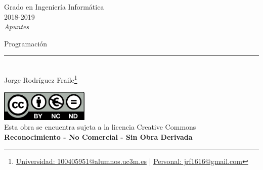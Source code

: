 \documentclass[12pt]{report} %
\begin{document}
	
\begin{titlepage}
	\begin{sffamily}
	\color{azulUC3M}
	\begin{center}
		\begin{figure}[H] %
		\end{figure}
		\vspace{2.5cm}
		\begin{Large}
			Grado en Ingeniería Informática\\			
			2018-2019\\
			\vspace{2cm}		
			\textsl{Apuntes}\\
			\bigskip
		\end{Large}
		 	{\Huge Programación}\\
		 	\vspace*{0.5cm}
	 		\rule{10.5cm}{0.1mm}\\
			\vspace*{0.9cm}
			{\LARGE Jorge Rodríguez Fraile\footnote{\href{mailto:100405951@alumnos.uc3m.es}{Universidad: 100405951@alumnos.uc3m.es}  |  \href{mailto:jrf1616@gmail.com}{Personal: jrf1616@gmail.com}}}\\ 
			\vspace*{1cm}
	\end{center}
	\vfill
	\color{black}
		\includegraphics[width=4.2cm]{img/creativecommons.png}\\
		Esta obra se encuentra sujeta a la licencia Creative Commons\\ \textbf{Reconocimiento - No Comercial - Sin Obra Derivada}
	\end{sffamily}
\end{titlepage}


\tableofcontents
\thispagestyle{fancy}
\end{document}
